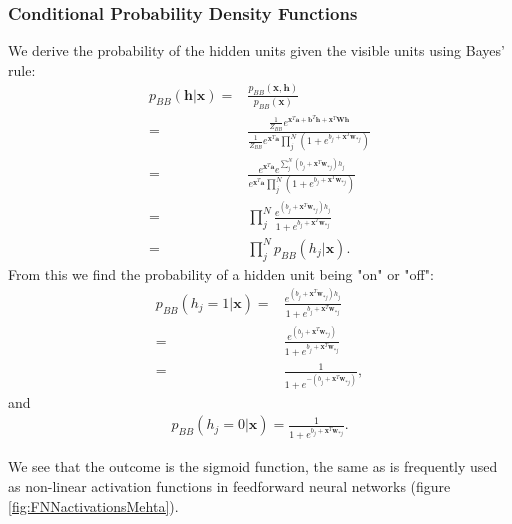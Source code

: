 \documentclass[twoside,english]{uiofysmaster}
\begin{document}
\subsubsection{Conditional Probability Density Functions}
We derive the probability of the hidden units given the visible units using Bayes' rule:
\begin{align}
	p_{BB} (\bm{h}|\bm{x}) =& \frac{p_{BB} (\bm{x}, \bm{h})}{p_{BB} (\bm{x})} \nonumber \\
	=& \frac{ \frac{1}{Z_{BB}}  e^{\bm{x}^T \bm{a} + \bm{b}^T \bm{h} + \bm{x}^T \bm{W} \bm{h}} }
	        {\frac{1}{Z_{BB}} e^{\bm{x}^T \bm{a}} \prod_j^N (1 + e^{b_j + \bm{x}^T \bm{w}_{\ast j}})} \nonumber \\
	=& \frac{  e^{\bm{x}^T \bm{a}} e^{ \sum_j^N (b_j + \bm{x}^T \bm{w}_{\ast j} ) h_j} }
	        { e^{\bm{x}^T \bm{a}} \prod_j^N (1 + e^{b_j + \bm{x}^T \bm{w}_{\ast j}})} \nonumber \\
	=& \prod_j^N \frac{ e^{(b_j + \bm{x}^T \bm{w}_{\ast j} ) h_j}  }
	{1 + e^{b_j + \bm{x}^T \bm{w}_{\ast j}}} \nonumber \\
	=& \prod_j^N p_{BB} (h_j| \bm{x}) .
\end{align}
From this we find the probability of a hidden unit being "on" or "off":
\begin{align}
	p_{BB} (h_j=1 | \bm{x}) =&   \frac{ e^{(b_j + \bm{x}^T \bm{w}_{\ast j} ) h_j}  }
	{1 + e^{b_j + \bm{x}^T \bm{w}_{\ast j}}} \\
	=&  \frac{ e^{(b_j + \bm{x}^T \bm{w}_{\ast j} )}  }
	{1 + e^{b_j + \bm{x}^T \bm{w}_{\ast j}}} \\
	=&  \frac{ 1 }{1 + e^{-(b_j + \bm{x}^T \bm{w}_{\ast j})} } ,
\end{align}
and
\begin{align}
	p_{BB} (h_j=0 | \bm{x}) =\frac{ 1 }{1 + e^{b_j + \bm{x}^T \bm{w}_{\ast j}} } .
\end{align}

We see that the outcome is the sigmoid function, the same as is frequently used as non-linear activation functions in feedforward neural networks (figure \ref{fig:FNNactivationsMehta}).

\end{document}
